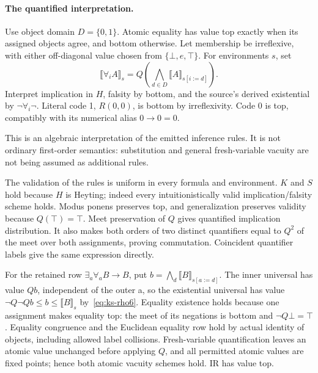 \paragraph{The quantified interpretation.}
Use object domain $D=\{0,1\}$.  Atomic equality has value top exactly
when its assigned objects agree, and bottom otherwise.  Let membership
be irreflexive, with either off-diagonal value chosen from
$\{\bot,e,\top\}$.  For environments $s$, set
\[
 \llbracket\forall_i A\rrbracket_s
 =Q\left(\bigwedge_{d\in D}\llbracket A\rrbracket_{s[i:=d]}\right).
\]
Interpret implication in $H$, falsity by bottom, and the source's
derived existential by $\neg\forall_i\neg$.  Literal code 1,
$R(0,0)$, is bottom by irreflexivity.  Code 0 is top, compatibly with
its numerical alias $0\to0=0$.

This is an algebraic interpretation of the emitted inference rules.
It is not ordinary first-order semantics: substitution and general
fresh-variable vacuity are not being assumed as additional rules.

The validation of the rules is uniform in every formula and environment.
$K$ and $S$ hold because $H$ is Heyting; indeed every intuitionistically
valid implication/falsity scheme holds.  Modus ponens preserves top, and
generalization preserves validity because $Q(\top)=\top$.
Meet preservation of $Q$ gives quantified implication distribution.
It also makes both orders of two distinct quantifiers equal to $Q^2$
of the meet over both assignments, proving commutation.  Coincident
quantifier labels give the same expression directly.

For the retained row $\exists_a\forall_a B\to B$, put
$b=\bigwedge_d\llbracket B\rrbracket_{s[a:=d]}$.
The inner universal has value $Qb$, independent of the outer a, so the
existential universal has value $\neg Q\neg Qb\le b\le
\llbracket B\rrbracket_s$ by~\eqref{eq:ks-rho6}.
Equality existence holds because one assignment makes equality top:
the meet of its negations is bottom and $\neg Q\bot=\top$.
Equality congruence and the Euclidean equality row hold by actual
identity of objects, including allowed label collisions.
Fresh-variable quantification leaves an atomic value unchanged before
applying $Q$, and all permitted atomic values are fixed points; hence
both atomic vacuity schemes hold.  IR has value top.

